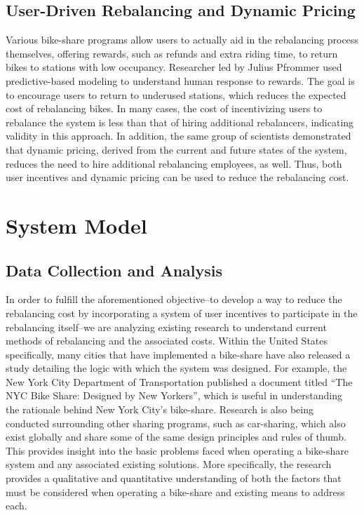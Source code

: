 \documentclass{sig-alternate}
\begin{document}
\subsection{User-Driven Rebalancing and Dynamic Pricing}
Various bike-share programs allow users to actually aid in the rebalancing process themselves, offering rewards, such as refunds and extra riding time, to return bikes to stations with low occupancy. Researcher led by Julius Pfrommer used predictive-based modeling to understand human response to rewards. The goal is to encourage users to return to underused stations, which reduces the expected cost of rebalancing bikes. In many cases, the cost of incentivizing users to rebalance the system is less than that of hiring additional rebalancers, indicating validity in this approach. In addition, the same group of scientists demonstrated that dynamic pricing, derived from the current and future states of the system, reduces the need to hire additional rebalancing employees, as well. Thus, both user incentives and dynamic pricing can be used to reduce the rebalancing cost.


\section{System Model}
\label{sec:project_proposal}

\subsection{Data Collection and Analysis}
\label{subsec:approach}
In order to fulfill the aforementioned objective--to develop a way to reduce the rebalancing cost by incorporating a system of user incentives to participate in the rebalancing itself--we are analyzing existing research to understand current methods of rebalancing and the associated costs. Within the United States specifically, many cities that have implemented a bike-share have also released a study detailing the logic with which the system was designed. For example, the New York City Department of Transportation published a document titled ``The NYC Bike Share: Designed by New Yorkers'', which is useful in understanding the rationale behind New York City's bike-share. Research is also being conducted surrounding other sharing programs, such as car-sharing, which also exist globally and share some of the same design principles and rules of thumb. This provides insight into the basic problems faced when operating a bike-share system and any associated existing solutions. More specifically, the research provides a qualitative and quantitative understanding of both the factors that must be considered when operating a bike-share and existing means to address each. \newline
\end{document}
